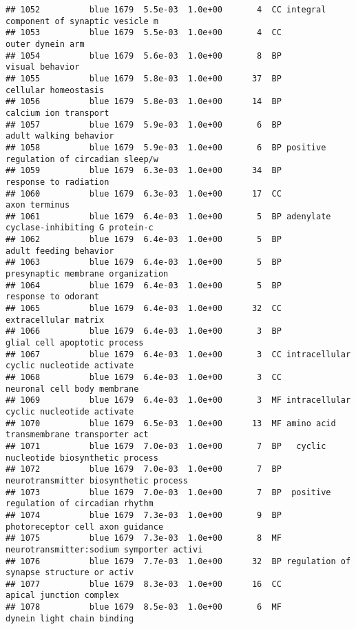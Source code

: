 \documentclass[]{article}
\begin{document}
\begin{verbatim}
## 1052          blue 1679  5.5e-03  1.0e+00       4  CC integral component of synaptic vesicle m
## 1053          blue 1679  5.5e-03  1.0e+00       4  CC                         outer dynein arm
## 1054          blue 1679  5.6e-03  1.0e+00       8  BP                          visual behavior
## 1055          blue 1679  5.8e-03  1.0e+00      37  BP                     cellular homeostasis
## 1056          blue 1679  5.8e-03  1.0e+00      14  BP                    calcium ion transport
## 1057          blue 1679  5.9e-03  1.0e+00       6  BP                   adult walking behavior
## 1058          blue 1679  5.9e-03  1.0e+00       6  BP positive regulation of circadian sleep/w
## 1059          blue 1679  6.3e-03  1.0e+00      34  BP                    response to radiation
## 1060          blue 1679  6.3e-03  1.0e+00      17  CC                            axon terminus
## 1061          blue 1679  6.4e-03  1.0e+00       5  BP adenylate cyclase-inhibiting G protein-c
## 1062          blue 1679  6.4e-03  1.0e+00       5  BP                   adult feeding behavior
## 1063          blue 1679  6.4e-03  1.0e+00       5  BP        presynaptic membrane organization
## 1064          blue 1679  6.4e-03  1.0e+00       5  BP                      response to odorant
## 1065          blue 1679  6.4e-03  1.0e+00      32  CC                     extracellular matrix
## 1066          blue 1679  6.4e-03  1.0e+00       3  BP             glial cell apoptotic process
## 1067          blue 1679  6.4e-03  1.0e+00       3  CC intracellular cyclic nucleotide activate
## 1068          blue 1679  6.4e-03  1.0e+00       3  CC              neuronal cell body membrane
## 1069          blue 1679  6.4e-03  1.0e+00       3  MF intracellular cyclic nucleotide activate
## 1070          blue 1679  6.5e-03  1.0e+00      13  MF amino acid transmembrane transporter act
## 1071          blue 1679  7.0e-03  1.0e+00       7  BP   cyclic nucleotide biosynthetic process
## 1072          blue 1679  7.0e-03  1.0e+00       7  BP    neurotransmitter biosynthetic process
## 1073          blue 1679  7.0e-03  1.0e+00       7  BP  positive regulation of circadian rhythm
## 1074          blue 1679  7.3e-03  1.0e+00       9  BP         photoreceptor cell axon guidance
## 1075          blue 1679  7.3e-03  1.0e+00       8  MF neurotransmitter:sodium symporter activi
## 1076          blue 1679  7.7e-03  1.0e+00      32  BP regulation of synapse structure or activ
## 1077          blue 1679  8.3e-03  1.0e+00      16  CC                  apical junction complex
## 1078          blue 1679  8.5e-03  1.0e+00       6  MF               dynein light chain binding

\end{verbatim}
\end{document}
